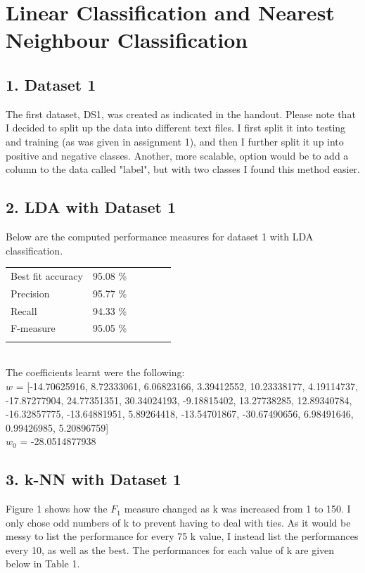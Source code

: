 \documentclass[11pt]{article}
\begin{document}
\pagebreak

\section*{Linear Classification and Nearest Neighbour Classification}
\subsection*{1. Dataset 1}
The first dataset, DS1, was created as indicated in the handout. Please note that I decided to split up the data into different text files. I first split it into testing and training (as was given in assignment 1), and then I further split it up into positive and negative classes. Another, more scalable, option would be to add a column to the data called "label", but with two classes I found this method easier.

\subsection*{2. LDA with Dataset 1}
Below are the computed performance measures for dataset 1 with LDA classification.\\
\begin{tabular}{llllll}
Best fit accuracy & 95.08 \% &  &  &  &  \\
Precision         & 95.77 \% &  &  &  &  \\
Recall            & 94.33 \% &  &  &  &  \\
F-measure         & 95.05 \% &  &  &  &  \\
                  &          &  &  &  &  \\
\end{tabular}
\\
\noindent
The coefficients learnt were the following:\\
$w$ = [-14.70625916, 8.72333061, 6.06823166, 3.39412552, 10.23338177, 4.19114737, -17.87277904, 24.77351351, 30.34024193, -9.18815402, 13.27738285, 12.89340784, -16.32857775, -13.64881951, 5.89264418, -13.54701867, -30.67490656, 6.98491646, 0.99426985, 5.20896759]\\
$w_0$ = -28.0514877938
\subsection*{3. k-NN with Dataset 1}
Figure 1 shows how the $F_1$ measure changed as k was increased from 1 to 150. I only chose odd numbers of k to prevent having to deal with ties. As it would be messy to list the performance for every 75 k value, I instead list the performances every 10, as well as the best. The performances for each value of k are given below in Table 1. 
\end{document}
